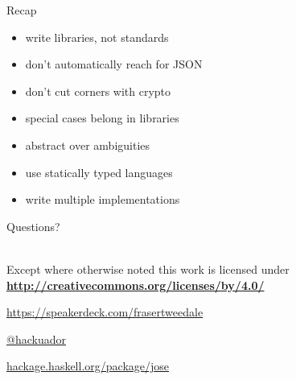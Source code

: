 \documentclass[ignorenonframetext,aspectratio=43]{beamer}
\providecommand{\tightlist}{%
  \setlength{\itemsep}{0pt}\setlength{\parskip}{0pt}}
\begin{document}
\begin{frame}{Recap}
\begin{itemize}
\tightlist
\item write libraries, not standards
\item don't automatically reach for JSON
\item don't cut corners with crypto
\item special cases belong in libraries
\item abstract over ambiguities
\item use statically typed languages
\item write multiple implementations
\end{itemize}
\end{frame}









\begin{frame}[plain]

    \begin{center}
        \Huge Questions?
        \bigskip
    \end{center}

    \hypersetup{urlcolor=black}

    \setlength{\parskip}{.5em}

    {\centering
    \\
    { \scriptsize
    Except where otherwise noted this work is licensed under
    }\\
    { \footnotesize
      \textbf{\url{http://creativecommons.org/licenses/by/4.0/}}
    }

    \bigskip
    \large \tt

    \url{https://speakerdeck.com/frasertweedale}

    \href{https://twitter.com/hackuador}{@hackuador}

    \href{https://hackage.haskell.org/package/jose}{hackage.haskell.org/package/jose}

    }

\end{frame}
\end{document}
